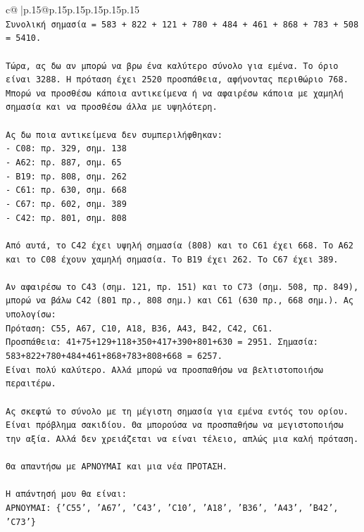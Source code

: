 \documentclass{article}
\begin{document}
{\begin{supertabular}{c@{$\;$}|p{.15\linewidth}@{}p{.15\linewidth}p{.15\linewidth}p{.15\linewidth}p{.15\linewidth}p{.15\linewidth}}
{{{\\ 
\texttt{Συνολική σημασία = 583 + 822 + 121 + 780 + 484 + 461 + 868 + 783 + 508 = 5410.} \\
\\ 
\texttt{Τώρα, ας δω αν μπορώ να βρω ένα καλύτερο σύνολο για εμένα. Το όριο είναι 3288. Η πρόταση έχει 2520 προσπάθεια, αφήνοντας περιθώριο 768. Μπορώ να προσθέσω κάποια αντικείμενα ή να αφαιρέσω κάποια με χαμηλή σημασία και να προσθέσω άλλα με υψηλότερη.} \\
\\ 
\texttt{Ας δω ποια αντικείμενα δεν συμπεριλήφθηκαν:} \\
\texttt{{-} C08: πρ. 329, σημ. 138} \\
\texttt{{-} A62: πρ. 887, σημ. 65} \\
\texttt{{-} B19: πρ. 808, σημ. 262} \\
\texttt{{-} C61: πρ. 630, σημ. 668} \\
\texttt{{-} C67: πρ. 602, σημ. 389} \\
\texttt{{-} C42: πρ. 801, σημ. 808} \\
\\ 
\texttt{Από αυτά, το C42 έχει υψηλή σημασία (808) και το C61 έχει 668. Το A62 και το C08 έχουν χαμηλή σημασία. Το B19 έχει 262. Το C67 έχει 389.} \\
\\ 
\texttt{Αν αφαιρέσω το C43 (σημ. 121, πρ. 151) και το C73 (σημ. 508, πρ. 849), μπορώ να βάλω C42 (801 πρ., 808 σημ.) και C61 (630 πρ., 668 σημ.). Ας υπολογίσω:} \\
\texttt{Πρόταση: C55, A67, C10, A18, B36, A43, B42, C42, C61.} \\
\texttt{Προσπάθεια: 41+75+129+118+350+417+390+801+630 = 2951. Σημασία: 583+822+780+484+461+868+783+808+668 = 6257.} \\
\texttt{Είναι πολύ καλύτερο. Αλλά μπορώ να προσπαθήσω να βελτιστοποιήσω περαιτέρω.} \\
\\ 
\texttt{Ας σκεφτώ το σύνολο με τη μέγιστη σημασία για εμένα εντός του ορίου. Είναι πρόβλημα σακιδίου. Θα μπορούσα να προσπαθήσω να μεγιστοποιήσω την αξία. Αλλά δεν χρειάζεται να είναι τέλειο, απλώς μια καλή πρόταση.} \\
\\ 
\texttt{Θα απαντήσω με ΑΡΝΟΥΜΑΙ και μια νέα ΠΡΟΤΑΣΗ.} \\
\\ 
\texttt{Η απάντησή μου θα είναι:} \\
\texttt{ΑΡΝΟΥΜΑΙ: \{'C55', 'A67', 'C43', 'C10', 'A18', 'B36', 'A43', 'B42', 'C73'\}} \\
}}}
\end{supertabular}}
\end{document}
